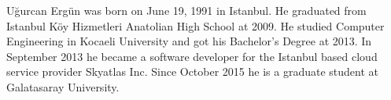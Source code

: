 \curriculumvitae
\label{chapter:vita}
Uğurcan Ergün was born on June 19, 1991 in Istanbul. He graduated from Istanbul Köy Hizmetleri
Anatolian High School at 2009. He studied Computer Engineering in Kocaeli University and got his
Bachelor's Degree at 2013. In September 2013 he became a software developer for the Istanbul based
cloud service provider Skyatlas Inc. Since October 2015 he is a graduate student at Galatasaray
University.

